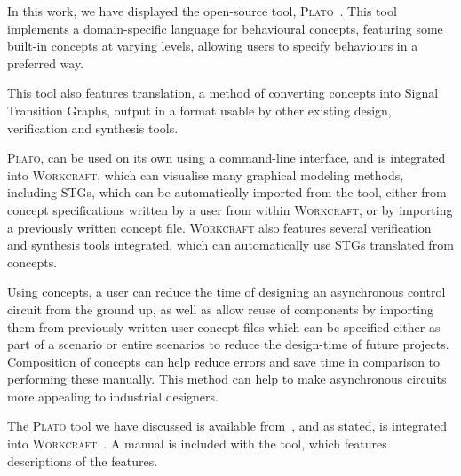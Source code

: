 \documentclass[british,conference,compsoc]{IEEEtran}
\newcommand{\noun}[1]{\textsc{#1}}
\begin{document}
\vspace{-3mm}

In this work, we have displayed the open-source
tool, \noun{Plato}~\cite{2016_concepts_github}. This tool implements a 
domain-specific language for behavioural concepts, featuring some built-in 
concepts at varying levels, allowing users to specify behaviours in a preferred 
way. 

This tool also features translation, a method of converting concepts into Signal
Transition Graphs, output in a format usable by other existing design, 
verification and synthesis tools. 

\noun{Plato}, can be used on its own using a command-line interface, and is
integrated into \noun{Workcraft}, which can visualise many graphical modeling
methods, including STGs, which can be automatically imported from the
tool, either from concept specifications written by a user from within 
\noun{Workcraft}, or by importing a previously written concept file.
\noun{Workcraft} also features several verification and synthesis tools 
integrated, which can automatically use STGs translated from concepts. 

Using concepts, a user can reduce the time of designing an asynchronous
control circuit from the ground up, as well as allow reuse of components
by importing them from previously written user concept files which can be 
specified either as part of a scenario or entire scenarios to reduce the 
design-time of future projects. Composition of concepts can help
reduce errors and save time in comparison to performing these manually.
This method can help to make asynchronous circuits more appealing
to industrial designers.


The \noun{Plato} tool we have discussed is available 
from~\cite{2016_concepts_github}, and as stated, is integrated into 
\noun{Workcraft}~\cite{Workcraft_website}. A manual is included with the tool, 
which features descriptions of the features. 



\end{document}
